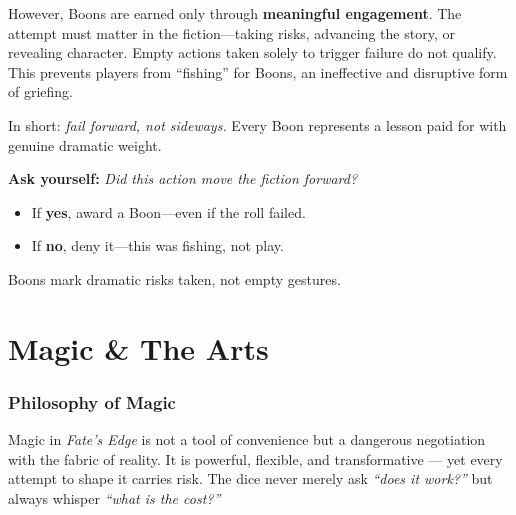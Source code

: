 \documentclass[12pt]{book}
\begin{document}
However, Boons are earned only through \textbf{meaningful engagement}. The attempt must matter in the fiction—taking risks, advancing the story, or revealing character. Empty actions taken solely to trigger failure do not qualify. This prevents players from ``fishing'' for Boons, an ineffective and disruptive form of griefing.  

In short: \emph{fail forward, not sideways.} Every Boon represents a lesson paid for with genuine dramatic weight.

\begin{tcolorbox}[title=GM Callout: Awarding Boons,colback=black!2,colframe=black!40!white]
  \textbf{Ask yourself:} \emph{Did this action move the fiction forward?}  
  
  \begin{itemize}
    \item If \textbf{yes}, award a Boon—even if the roll failed.  
    \item If \textbf{no}, deny it—this was fishing, not play.  
  \end{itemize}
  
  Boons mark dramatic risks taken, not empty gestures.
  \end{tcolorbox}

\part{Magic \& The Arts}

\section{Philosophy of Magic}

Magic in \textit{Fate’s Edge} is not a tool of convenience but a dangerous negotiation with the fabric of reality.  
It is powerful, flexible, and transformative — yet every attempt to shape it carries risk. The dice never merely ask \emph{“does it work?”} but always whisper \emph{“what is the cost?”}
\end{document}
